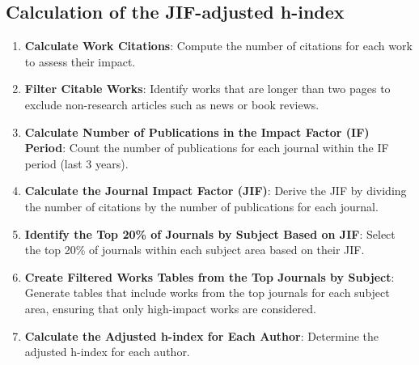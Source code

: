 \subsection{Calculation of the JIF-adjusted h-index}
\begin{enumerate}
      \item \textbf{Calculate Work Citations}: Compute the number of citations for each work to assess their impact.

      \item \textbf{Filter Citable Works}: Identify works that are longer than two pages to exclude non-research articles such as news or book reviews.

      \item \textbf{Calculate Number of Publications in the Impact Factor (IF) Period}: Count the number of publications
            for each journal within the IF period (last 3 years).

      \item \textbf{Calculate the Journal Impact Factor (JIF)}: Derive the JIF by dividing the number of citations by
            the number of publications for each journal.

      \item \textbf{Identify the Top 20\% of Journals by Subject Based on JIF}: Select the top 20\% of journals within
            each subject area based on their JIF\@.

      \item \textbf{Create Filtered Works Tables from the Top Journals by Subject}: Generate tables that include works from
            the top journals for each subject area, ensuring that only high-impact works are considered.

      \item \textbf{Calculate the Adjusted h-index for Each Author}: Determine the adjusted h-index for each author.
\end{enumerate}

